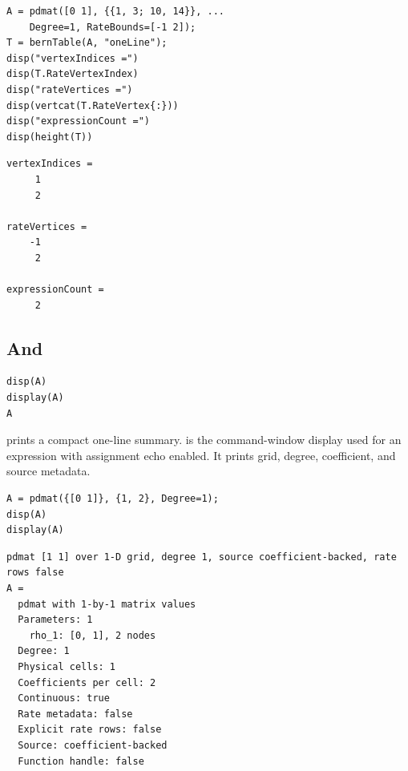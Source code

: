 \begin{lstlisting}[style=dpmatlab]
A = pdmat([0 1], {{1, 3; 10, 14}}, ...
    Degree=1, RateBounds=[-1 2]);
T = bernTable(A, "oneLine");
disp("vertexIndices =")
disp(T.RateVertexIndex)
disp("rateVertices =")
disp(vertcat(T.RateVertex{:}))
disp("expressionCount =")
disp(height(T))
\end{lstlisting}

\begin{lstlisting}[style=dpoutput]
vertexIndices =
     1
     2

rateVertices =
    -1
     2

expressionCount =
     2
\end{lstlisting}

\subsection{\texorpdfstring{}{disp} And \texorpdfstring{}{display}}
\label{sec:pdmat-display}

\syntaxhead
\begin{lstlisting}[style=dpsyntax]
disp(A)
display(A)
A
\end{lstlisting}

\arghead {} prints a compact one-line summary.  is the command-window display used for an expression with assignment echo enabled. It prints grid, degree, coefficient, and source metadata.

\examplehead
\begin{lstlisting}[style=dpmatlab]
A = pdmat({[0 1]}, {1, 2}, Degree=1);
disp(A)
display(A)
\end{lstlisting}

\begin{lstlisting}[style=dpoutput]
pdmat [1 1] over 1-D grid, degree 1, source coefficient-backed, rate rows false
A =
  pdmat with 1-by-1 matrix values
  Parameters: 1
    rho_1: [0, 1], 2 nodes
  Degree: 1
  Physical cells: 1
  Coefficients per cell: 2
  Continuous: true
  Rate metadata: false
  Explicit rate rows: false
  Source: coefficient-backed
  Function handle: false
\end{lstlisting}

\subsection{\texorpdfstring{}{plot}}
\label{sec:pdmat-plot}

